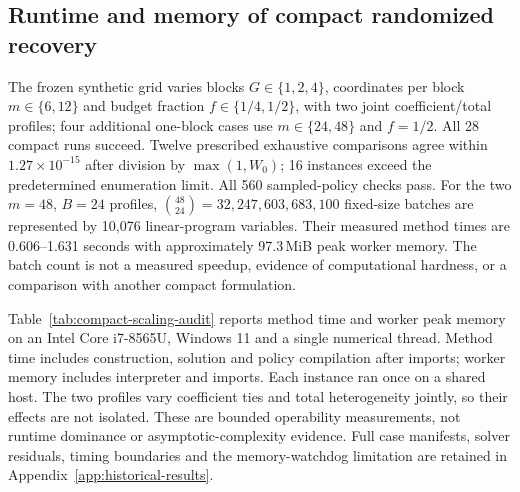 \documentclass[12pt]{article}
\begin{document}
\subsection{Runtime and memory of compact randomized recovery}
The frozen synthetic grid varies blocks $G\in\{1,2,4\}$, coordinates per
block $m\in\{6,12\}$ and budget fraction $f\in\{1/4,1/2\}$, with two
joint coefficient/total profiles; four additional one-block cases use
$m\in\{24,48\}$ and $f=1/2$. All 28 compact runs succeed. Twelve prescribed
exhaustive comparisons agree within $1.27\times10^{-15}$ after division by
$\max(1,W_0)$; 16 instances exceed the predetermined enumeration limit.
All 560 sampled-policy checks pass.
For the two $m=48$, $B=24$ profiles, $\binom{48}{24}=32{,}247{,}603{,}683{,}100$
fixed-size batches are represented by 10,076 linear-program variables.
Their measured method times are 0.606--1.631 seconds with approximately
97.3\,MiB peak worker memory. The batch count is not a measured speedup,
evidence of computational hardness, or a comparison with another compact
formulation.

Table~\ref{tab:compact-scaling-audit} reports method time and worker peak
memory on an Intel Core i7-8565U, Windows 11 and a single numerical thread.
Method time includes construction, solution and policy compilation after
imports; worker memory includes interpreter and imports. Each instance ran
once on a shared host. The two profiles vary coefficient ties and total
heterogeneity jointly, so their effects are not isolated. These are bounded
operability measurements, not runtime dominance or asymptotic-complexity
evidence. Full case manifests, solver residuals, timing boundaries and the
memory-watchdog limitation are retained in
Appendix~\ref{app:historical-results}.
\end{document}
